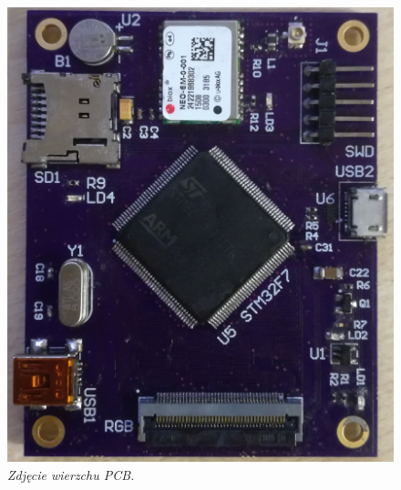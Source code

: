 \documentclass[eng,printmode]{mgr}
\begin{document}
\begin{center}\centering
\begin{figure}[!h]
\vskip 1cm
    \centering
    \includegraphics[width=\textwidth]{images/topPcb.jpg}
    \caption{\textit{Zdjęcie wierzchu PCB.}}
\end{figure}
\end{center}
\end{document}
